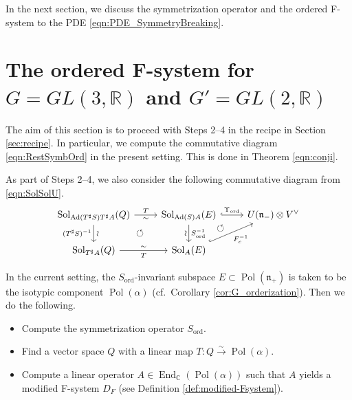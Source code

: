 \documentclass[a4paper,11pt,reqno]{amsart}
\newcommand{\frakn}{\mathfrak{n}}
\newcommand{\RR}{\mathbb{R}}
\newcommand{\0}{{\bf 0}}
\newcommand{\C}{\mathbb{C}}
\newcommand{\1}{{\bf 1}}
\DeclareMathOperator{\Ad}{Ad}
\DeclareMathOperator{\End}{End}
\DeclareMathOperator{\Pol}{Pol}
\newcommand{\ord}{{\mathrm{ord}}}
\DeclareMathOperator{\Sol}{Sol}
\theoremstyle{plain}
\theoremstyle{definition}
\numberwithin{equation}{section}
\theoremstyle{definition}
\begin{document}
In the next section, we discuss the symmetrization operator 
and the ordered F-system to the PDE \eqref{eqn:PDE_SymmetryBreaking}.


\section{The ordered F-system for \texorpdfstring{$G=GL(3,\RR)$}{G=GL(3,R)} and \texorpdfstring{$G'=GL(2,\RR)$}{G'=GL(2,R)}}
\label{sec:ordered-GL(3)}

The aim of this section is to proceed with Steps 2--4 in the recipe 
in Section \ref{sec:recipe}.
In particular, we compute the commutative diagram
\eqref{eqn:RestSymbOrd} in the present setting.
This is done in Theorem \ref{eqn:conji}. 

As part of Steps 2--4, 
we also consider the following commutative diagram
from  \eqref{eqn:SolSolU}.
\begin{equation*}
\begin{tikzcd}
	{\Sol_{\Ad(T^\sharp S)T^\sharp A }(Q)} & 
	{\Sol_{\Ad(S)A}(E)} 	\arrow[dl, pos=0.5, phantom, "\circlearrowleft"]
	&{U(\frakn_-)\otimes V^\vee} \\
	{\Sol_{T^\sharp A}(Q)} & {\Sol_{A}(E)} &
	\arrow[ul, pos=0.85, phantom, "\circlearrowleft"]
	\arrow[r, "\Upsilon_{\ord}", hook, from=1-2, to=1-3]
	\arrow["F_c^{-1}"', hook, from=2-2, to=1-3]
	\arrow["{T}", "\sim"' , from=1-1, to=1-2]
	\arrow["\sim" sloped, "(T^\sharp S)^{-1}"', from=1-1, to=2-1]
	\arrow["S^{-1}_{\ord}", "\sim"' sloped,  from=1-2, to=2-2]
	\arrow["\sim" , "{T}"',  from=2-1, to=2-2]
\end{tikzcd}
\end{equation*}

In the current setting,
the $S_\ord$-invariant subspace $E \subset \Pol(\frakn_+)$ 
is taken to be the isotypic component $\Pol(\alpha)$ 
(cf.\  Corollary \ref{cor:G_orderization}).
Then we do the following.
\vspace{3pt}

\begin{itemize}

\item
Compute the symmetrization operator $S_\ord$.
\vskip 0.1in

\item
Find a vector space $Q$ with a linear map 
$T\colon Q \stackrel{\sim}{\to} \Pol(\alpha)$.
\vskip 0.1in

\item
Compute a linear operator $A \in \End_\C(\Pol(\alpha))$
such that $A$ yields a modified F-system $D_F$ (see Definition \ref{def:modified-Fsystem}).
\vskip 0.1in

\end{itemize}
\end{document}
